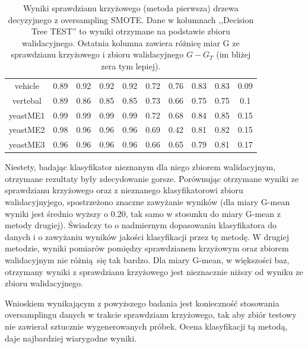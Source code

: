 \begin{table}[h]
\begin{center}
{\begin{tabular}{|c|c|c|c|c|c|c|c|c|c|}
				vehicle&0.89&0.92&0.92&0.92&0.72&0.76&0.83&0.83&0.09\\%
				vertebal&0.89&0.86&0.85&0.85&0.73&0.66&0.75&0.75&0.1\\%
				yeastME1&0.99&0.99&0.99&0.99&0.72&0.68&0.84&0.85&0.15\\%
				yeastME2&0.98&0.96&0.96&0.96&0.69&0.42&0.81&0.82&0.15\\%
				yeastME3&0.96&0.96&0.96&0.96&0.66&0.65&0.79&0.81&0.17\\%
				\hline%
			\end{tabular}}%
			\caption[Wyniki sprawdzianu krzyżowego z metodą SMOTE, metoda pierwsza]{Wyniki sprawdzianu krzyżowego (metoda pierwsza) drzewa decyzyjnego z oversampling SMOTE. Dane w kolumnach ,,Decision Tree TEST'' to wyniki otrzymane na podstawie zbioru walidacyjnego. Ostatnia kolumna zawiera różnicę  miar G ze sprawdzianu krzyżowego i zbioru walidacyjnego $G-G_T$ (im bliżej zera tym lepiej).}
			\label{CVoversampling1}
		\end{center}
	\end{table}
Niestety, badając klasyfikator nieznanym dla niego zbiorem walidacyjnym, otrzymane rezultaty były zdecydowanie gorsze. Porównując otrzymane wyniki ze sprawdzianu krzyżowego oraz z nieznanego klasyfikatorowi zbioru walidacyjnyjego, spostrzeżono znaczne zawyżanie wyników (dla miary G-mean wyniki jest średnio wyższy o 0.20, tak samo w stosunku do miary G-mean z metody drugiej). Świadczy to o nadmiernym dopasowaniu klasyfikatora do danych i o zawyżaniu wyników jakości klasyfikacji przez tę metodę. W drugiej metodzie, wyniki pomiarów pomiędzy sprawdzianem krzyżowym oraz zbiorem walidacyjnym nie różnią się tak bardzo. Dla miary G-mean, w większości baz, otrzymany wyniki z sprawdzianu krzyżowego jest nieznacznie niższy od wyniku ze zbioru walidacyjnego. \par
Wnioskiem wynikającym z powyższego badania jest konieczność stosowania oversamplingu danych w trakcie sprawdzianu krzyżowego, tak aby zbiór testowy nie zawierał sztucznie wygenerowanych próbek. Ocena klasyfikacji tą metodą, daje najbardziej wiarygodne wyniki.



